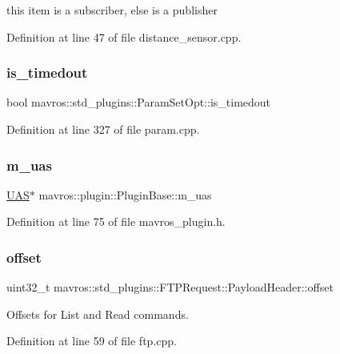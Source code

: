 this item is a subscriber, else is a publisher 



Definition at line 47 of file distance\+\_\+sensor.\+cpp.

\mbox{\label{group__plugin_gad60618c9119e01a1c6aecc962d324ac3}} 
\subsubsection{\texorpdfstring{is\_timedout}{is\_timedout}}
{\footnotesize\ttfamily bool mavros\+::std\+\_\+plugins\+::\+Param\+Set\+Opt\+::is\+\_\+timedout}



Definition at line 327 of file param.\+cpp.

\mbox{\label{group__plugin_ga198ba0390b8d70025bfb7f9467ae3057}} 
\subsubsection{\texorpdfstring{m\_uas}{m\_uas}}
{\footnotesize\ttfamily \mbox{\hyperlink{classmavros_1_1UAS}{U\+AS}}$\ast$ mavros\+::plugin\+::\+Plugin\+Base\+::m\+\_\+uas\hspace{0.3cm}{\ttfamily [protected]}}



Definition at line 75 of file mavros\+\_\+plugin.\+h.

\mbox{\label{group__plugin_gad3b592e2842b6992de35f68befe7b068}} 
\subsubsection{\texorpdfstring{offset}{offset}}
{\footnotesize\ttfamily uint32\+\_\+t mavros\+::std\+\_\+plugins\+::\+F\+T\+P\+Request\+::\+Payload\+Header\+::offset}



Offsets for List and Read commands. 



Definition at line 59 of file ftp.\+cpp.

\mbox{\label{group__plugin_ga340cfea8909b60e37e878965187fc278}} 
